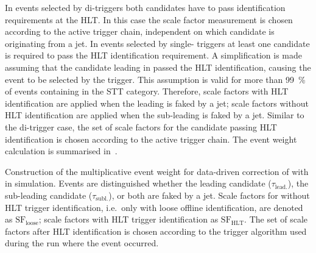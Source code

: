 In events selected by di-\tauhadvis triggers both \tauhadvis
candidates have to pass identification requirements at the HLT. In
this case the scale factor measurement is chosen according to the
active trigger chain, independent on which \tauhadvis candidate is
originating from a jet. In events selected by single-\tauhadvis
triggers at least one \tauhadvis candidate is required to pass the
HLT \tauhadvis identification requirement. A simplification is made
assuming that the \tauhadvis candidate leading in \pT passed the HLT
\tauhadvis identification, causing the event to be selected by the
trigger. This assumption is valid for more than \SI{99}{\percent} of
\ttbar events containing \faketauhadvis in the STT
category. Therefore, scale factors with HLT identification are applied
when the leading \tauhadvis is faked by a jet; scale factors without
HLT identification are applied when the sub-leading \tauhadvis is faked
by a jet. Similar to the di-\tauhadvis trigger case, the set of scale
factors for the candidate passing HLT identification is chosen
according to the active trigger chain. The event weight calculation is
summarised in~.

\begin{table}[htbp]
  \centering

  \caption{Construction of the multiplicative event weight for
    data-driven correction of \ttbar with \faketauhadvis in
    simulation. Events are distinguished whether the leading
    \tauhadvis candidate ($\tau_{\text{lead.}}$), the sub-leading
    \tauhadvis candidate ($\tau_{\text{subl.}}$), or both are faked by
    a jet.  Scale factors for \faketauhadvis without HLT trigger
    identification, i.e.\ only with loose offline \tauhadvis
    identification, are denoted as $\text{SF}_{\text{loose}}$;
    scale factors with HLT trigger identification as
    $\text{SF}_\text{HLT}$. The set of scale factors after HLT
    \tauhadvis identification is chosen according to the trigger
    algorithm used during the run where the event occurred.}%
  \label{tab:ttbarSF_application_rule}

  
\end{table}

